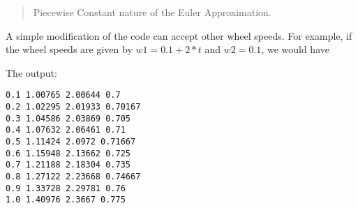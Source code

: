 \begin{quote}
Piecewise Constant nature of the Euler Approximation.
\end{quote}

A simple modification of the code can accept other wheel speeds. For
example, if the wheel speeds are given by \(w1 = 0.1 + 2*t\) and
\(w2 = 0.1\), we would have

\hypertarget{listDDvarwheel}{%
\label{listDDvarwheel}}%
\begin{Shaded}
\begin{Highlighting}[]
\OperatorTok{=} \OperatorTok{;}\OperatorTok{=} \OperatorTok{;}\OperatorTok{=} 
\OperatorTok{=} \OperatorTok{;}\OperatorTok{=} 
\OperatorTok{=} \OperatorTok{:}
    \OperatorTok{,}\OperatorTok{,}\OperatorTok{,}\OperatorTok{,}
\OperatorTok{=}  \OperatorTok{+} \OperatorTok{*}
\OperatorTok{=} 
\OperatorTok{,}\OperatorTok{,}\OperatorTok{=}\OperatorTok{,}\OperatorTok{,}\OperatorTok{,}\OperatorTok{,}\OperatorTok{,}\OperatorTok{,}\OperatorTok{,}
\OperatorTok{+=}
\OperatorTok{,}\OperatorTok{=}\NormalTok{)}\OperatorTok{,} \OperatorTok{,}\OperatorTok{,}\OperatorTok{=}\NormalTok{)}\OperatorTok{,} \OperatorTok{,}\OperatorTok{,}\OperatorTok{=}\NormalTok{)}\OperatorTok{,} \OperatorTok{,}\OperatorTok{,}\OperatorTok{=}\NormalTok{))}
\end{Highlighting}
\end{Shaded}

The output:

\begin{verbatim}
0.1 1.00765 2.00644 0.7
0.2 1.02295 2.01933 0.70167
0.3 1.04586 2.03869 0.705
0.4 1.07632 2.06461 0.71
0.5 1.11424 2.0972 0.71667
0.6 1.15948 2.13662 0.725
0.7 1.21188 2.18304 0.735
0.8 1.27122 2.23668 0.74667
0.9 1.33728 2.29781 0.76
1.0 1.40976 2.3667 0.775
\end{verbatim}

